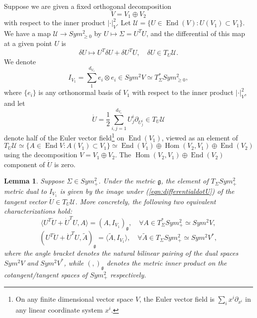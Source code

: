 \documentclass[a4paper]{article}
\newtheorem{lem}[thm]{Lemma}
\theoremstyle{definition}
\newcommand{\1}{\mathbbm{1}}
\DeclareMathOperator{\Hom}{Hom}
\DeclareMathOperator{\End}{End}
\begin{document}
	Suppose we are given a fixed orthogonal decomposition
	\[
	V=V_1\oplus V_2
	\]
	with respect to the inner product $|\cdot|_V^2$. Let
	$
	\mathcal{U}=\{ U\in \End(V): U(V_1)\subset V_1  \}.
	$
	We have a map $\mathcal{U}\to Sym^2_{\geq 0}$ by $U\mapsto \Sigma=U^T U$, and the differential of this map at a given point $U$ is 
	\begin{equation}\label{eqn:differentialdotU}
		\delta{U}\mapsto U^T \delta{U}+ \delta{U}^T U,\quad \delta{U}\in T_U\mathcal{U} .
	\end{equation}
	We denote 
	\[
	I_{V_1}= \sum_1^{d_{V_1}} e_i\otimes e_i \in Sym^2 V\simeq T_\Sigma^* Sym^2_{\geq 0} ,
	\]
	where $\{ e_i\}$ is any orthonormal basis of $V_1$ with respect to the inner product $|\cdot|_V^2$, and let 
	\[
	\dot{U}= \frac{1}{2} \sum_{i,j=1}^{d_{V_1}} U^i_j \partial_{U^i_j} \in T_U \mathcal{U}
	\]
	denote half of the Euler vector field\footnote{On any finite dimensional vector space $V$, the Euler vector field is $\sum_i x^i\partial_{x^i}$ in any linear coordinate system $x^i$.} on $\End(V_1)$, viewed as an element of 
	\[
	T_U\mathcal{U}\simeq \{ A \in \End{V}: A(V_1)\subset V_1\} \simeq \End(V_1)\oplus \Hom(V_2, V_1)\oplus \End(V_2)
	\]
	using the decomposition $V=V_1\oplus V_2$. The $\Hom(V_2, V_1)\oplus \End(V_2)$ component of $\dot{U}$ is zero. 
	
	
	
	\begin{lem}
		Suppose $\Sigma\in Sym^2_+$.
		Under the metric $\mathfrak{g}$, the element of $T_\Sigma Sym^2_+$ metric dual to $I_{V_1}$ is given by the image under (\ref{eqn:differentialdotU}) of the tangent vector $\dot{U}\in T_U\mathcal{U}$. More concretely, the following two equivalent characterizations hold:
		\begin{equation}\label{eqn:IV1dual1}
			\langle U^T \dot{U}+ \dot{U}^T U, A\rangle = (A, I_{V_1})_{\mathfrak{g}}, \quad \forall A\in T_\Sigma^* Sym^2_+\simeq Sym^2 V,
		\end{equation}
		\begin{equation}\label{eqn:IV1dual2}
			( U^T \dot{U}+ \dot{U}^T U, \tilde{A} )_{ \mathfrak{g} } = \langle \tilde{A}, I_{V_1}\rangle , \quad \forall \tilde{A}\in T_\Sigma Sym^2_+\simeq Sym^2 V^*,
		\end{equation}
		where the angle bracket denotes the natural bilinear pairing of the dual spaces $Sym^2 V$ and $Sym^2 V^*$, while $(, )_{\mathfrak{g}}$ denotes the metric inner product on the cotangent/tangent spaces of $Sym^2_+$ respectively.
	\end{lem}
	
\end{document}
